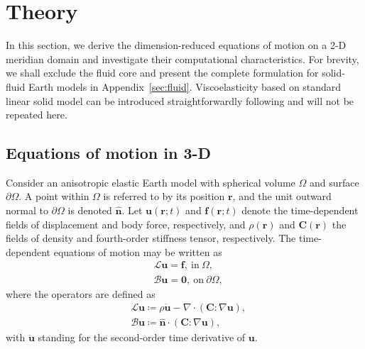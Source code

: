\documentclass[extra]{gji}
\begin{document}
\section{Theory}
\label{sec:theory}
In this section, we derive the dimension-reduced equations of motion
on a 2-D meridian domain and investigate their computational characteristics.
For brevity, we shall exclude the fluid core and present the complete 
formulation for solid-fluid Earth models in Appendix~\ref{sec:fluid}.
Viscoelasticity based on standard linear solid model can be introduced 
straightforwardly following \cite{van2014optimized} and will not be
repeated here.    

\subsection{Equations of motion in 3-D}
Consider an anisotropic elastic Earth model with spherical volume $\Omega$
and surface $\partial\Omega$. A point within $\Omega$ is referred
to by its position $\mathbf{r}$, and the unit outward normal
to $\partial\Omega$ is denoted $\hat{\mathbf{n}}$. 
Let $\mathbf{u}\left(\mathbf{r};t\right)$
and $\mathbf{f}\left(\mathbf{r};t\right)$ denote the time-dependent
fields of displacement and body force, respectively, 
and $\rho\left(\mathbf{r}\right)$
and $\mathbf{C}\left(\mathbf{r}\right)$ the fields of density and
fourth-order stiffness tensor, respectively. The 
time-dependent equations of motion may be written as
\begin{align}
  & \mathscr{L}\mathbf{u}=\mathbf{f},\ \text{in}\ \Omega,
  \label{eq:eom3d}\\[.5em]
  & \mathscr{B}\mathbf{u}=\mathbf{0},\ \text{on}\ \partial\Omega,
  \label{eq:surf3d}
\end{align}
where the operators are defined as
\begin{align}
  & \mathscr{L}\mathbf{u} \coloneqq \rho\ddot{\mathbf{u}}-
  \nabla\cdot\left(\mathbf{C}:\nabla\mathbf{u}\right),\\[.5em]
  & \mathscr{B}\mathbf{u} \coloneqq \hat{\mathbf{n}}\cdot
  \left(\mathbf{C}:\nabla\mathbf{u}\right),
\end{align}
with $\ddot{\mathbf{u}}$ standing for the second-order time 
derivative of $\mathbf{u}$.
\end{document}
